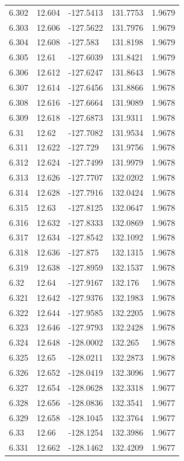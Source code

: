 \begin{tabular}{lllll}
6.302 & 12.604 & -127.5413 & 131.7753 & 1.9679 \\
6.303 & 12.606 & -127.5622 & 131.7976 & 1.9679 \\
6.304 & 12.608 & -127.583 & 131.8198 & 1.9679 \\
6.305 & 12.61 & -127.6039 & 131.8421 & 1.9679 \\
6.306 & 12.612 & -127.6247 & 131.8643 & 1.9678 \\
6.307 & 12.614 & -127.6456 & 131.8866 & 1.9678 \\
6.308 & 12.616 & -127.6664 & 131.9089 & 1.9678 \\
6.309 & 12.618 & -127.6873 & 131.9311 & 1.9678 \\
6.31 & 12.62 & -127.7082 & 131.9534 & 1.9678 \\
6.311 & 12.622 & -127.729 & 131.9756 & 1.9678 \\
6.312 & 12.624 & -127.7499 & 131.9979 & 1.9678 \\
6.313 & 12.626 & -127.7707 & 132.0202 & 1.9678 \\
6.314 & 12.628 & -127.7916 & 132.0424 & 1.9678 \\
6.315 & 12.63 & -127.8125 & 132.0647 & 1.9678 \\
6.316 & 12.632 & -127.8333 & 132.0869 & 1.9678 \\
6.317 & 12.634 & -127.8542 & 132.1092 & 1.9678 \\
6.318 & 12.636 & -127.875 & 132.1315 & 1.9678 \\
6.319 & 12.638 & -127.8959 & 132.1537 & 1.9678 \\
6.32 & 12.64 & -127.9167 & 132.176 & 1.9678 \\
6.321 & 12.642 & -127.9376 & 132.1983 & 1.9678 \\
6.322 & 12.644 & -127.9585 & 132.2205 & 1.9678 \\
6.323 & 12.646 & -127.9793 & 132.2428 & 1.9678 \\
6.324 & 12.648 & -128.0002 & 132.265 & 1.9678 \\
6.325 & 12.65 & -128.0211 & 132.2873 & 1.9678 \\
6.326 & 12.652 & -128.0419 & 132.3096 & 1.9677 \\
6.327 & 12.654 & -128.0628 & 132.3318 & 1.9677 \\
6.328 & 12.656 & -128.0836 & 132.3541 & 1.9677 \\
6.329 & 12.658 & -128.1045 & 132.3764 & 1.9677 \\
6.33 & 12.66 & -128.1254 & 132.3986 & 1.9677 \\
6.331 & 12.662 & -128.1462 & 132.4209 & 1.9677 \\

\end{tabular}
